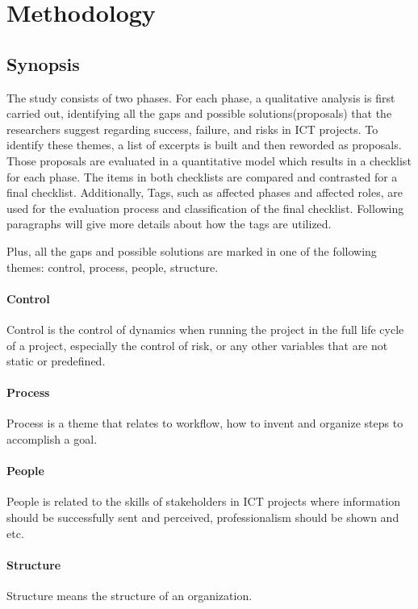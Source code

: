 
\section{Methodology}
\subsection{Synopsis}
The study consists of two phases. For each phase, a qualitative analysis is first carried out, identifying all the gaps and possible solutions(proposals) that the researchers suggest regarding success, failure, and risks in ICT projects. To identify these themes, a list of excerpts is built and then reworded as proposals. Those proposals are evaluated in a quantitative model which results in a checklist for each phase. The items in both checklists are compared and contrasted for a final checklist. Additionally, Tags, such as affected phases and affected roles, are used for the evaluation process and classification of the final checklist. Following paragraphs will give more details about how the tags are utilized.

Plus, all the gaps and possible solutions are marked in one of the following themes: control, process, people, structure.

\paragraph{Control} Control is the control of dynamics when running the project in the full life cycle of a project, especially the control of risk, or any other variables that are not static or predefined.

\paragraph{Process} Process is a theme that relates to workflow, how to invent and organize steps to accomplish a goal.

\paragraph{People} People is related to the skills of stakeholders in ICT projects where information should be successfully sent and perceived, professionalism should be shown and etc.

\paragraph{Structure} Structure means the structure of an organization.



